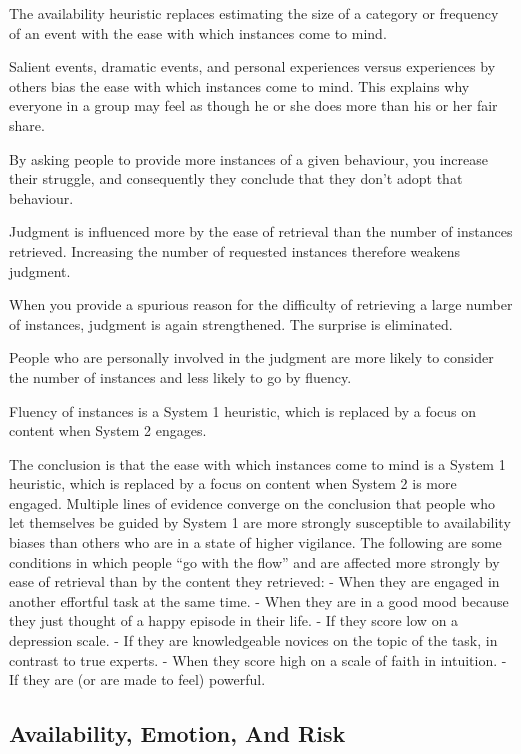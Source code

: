 \bit
\item The availability heuristic replaces estimating the size of a category or frequency of an event with the ease
with which instances come to mind.
\item Salient events, dramatic events, and personal experiences versus experiences by others bias the ease with which
instances come to mind. This explains why everyone in a group may feel as though he or she does more than his or her
fair share.
\item By asking people to provide more instances of a given behaviour, you increase their struggle, and consequently
they conclude that they don't adopt that behaviour.
\item Judgment is influenced more by the ease of retrieval than the number of instances retrieved. Increasing the
number of requested instances therefore weakens judgment.
\item When you provide a spurious reason for the difficulty of retrieving a large number of instances, judgment is
again strengthened. The surprise is eliminated.
\item People who are personally involved in the judgment are more likely to consider the number of instances and less
likely to go by fluency.
\item Fluency of instances is a System 1 heuristic, which is replaced by a focus on content when System 2 engages.
\item The conclusion is that the ease with which instances come to mind is a System 1 heuristic, which is replaced by
a focus on content when System 2 is more engaged. Multiple lines of evidence converge on the conclusion that people
who let themselves be guided by System 1 are more strongly susceptible to availability biases than others who are in
a state of higher vigilance. The following are some conditions in which people ``go with the flow” and are affected
more strongly by ease of retrieval than by the content they retrieved: - When they are engaged in another effortful
task at the same time. - When they are in a good mood because they just thought of a happy episode in their life. -
If they score low on a depression scale. - If they are knowledgeable novices on the topic of the task, in contrast to
true experts. - When they score high on a scale of faith in intuition. - If they are (or are made to feel) powerful.
\eit

\subsection*{Availability, Emotion, And Risk}


